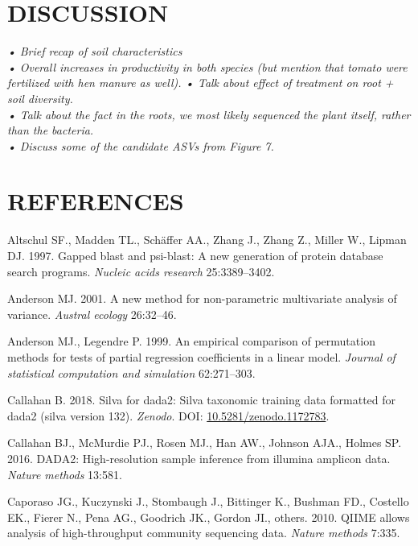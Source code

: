 \documentclass[11pt,]{article}
\begin{document}
\newpage  

\section{DISCUSSION}\label{discussion}

\emph{• Brief recap of soil characteristics}\\
\emph{• Overall increases in productivity in both species (but mention
that tomato were fertilized with hen manure as well).} \emph{• Talk
about effect of treatment on root + soil diversity.}\\
\emph{• Talk about the fact in the roots, we most likely sequenced the
plant itself, rather than the bacteria.}\\
\emph{• Discuss some of the candidate ASVs from Figure 7.}

\newpage  

\section*{REFERENCES}\label{references}

\hypertarget{refs}{}
\hypertarget{ref-altschul1997gapped}{}
Altschul SF., Madden TL., Schäffer AA., Zhang J., Zhang Z., Miller W.,
Lipman DJ. 1997. Gapped blast and psi-blast: A new generation of protein
database search programs. \emph{Nucleic acids research} 25:3389--3402.

\hypertarget{ref-anderson2001new}{}
Anderson MJ. 2001. A new method for non-parametric multivariate analysis
of variance. \emph{Austral ecology} 26:32--46.

\hypertarget{ref-anderson1999empirical}{}
Anderson MJ., Legendre P. 1999. An empirical comparison of permutation
methods for tests of partial regression coefficients in a linear model.
\emph{Journal of statistical computation and simulation} 62:271--303.

\hypertarget{ref-silva}{}
Callahan B. 2018. Silva for dada2: Silva taxonomic training data
formatted for dada2 (silva version 132). \emph{Zenodo}. DOI:
\href{https://doi.org/10.5281/zenodo.1172783}{10.5281/zenodo.1172783}.

\hypertarget{ref-callahan2016dada2}{}
Callahan BJ., McMurdie PJ., Rosen MJ., Han AW., Johnson AJA., Holmes SP.
2016. DADA2: High-resolution sample inference from illumina amplicon
data. \emph{Nature methods} 13:581.

\hypertarget{ref-caporaso2010qiime}{}
Caporaso JG., Kuczynski J., Stombaugh J., Bittinger K., Bushman FD.,
Costello EK., Fierer N., Pena AG., Goodrich JK., Gordon JI., others.
2010. QIIME allows analysis of high-throughput community sequencing
data. \emph{Nature methods} 7:335.
\end{document}
